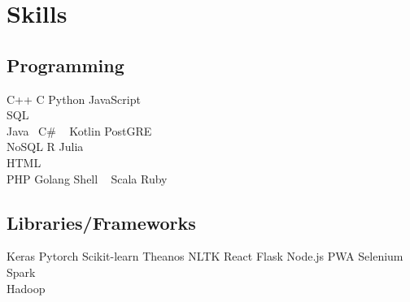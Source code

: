 \documentclass[]{BismayResume}
\begin{document}
\begin{minipage}[t]{0.70\textwidth}
%
%

\end{minipage} 
\hfill
\begin{minipage}[t]{0.25\textwidth} 


\section{Skills}
\subsection{Programming}
\sectionsep
{}
C++ \textbullet{} C \textbullet{} Python \textbullet{} JavaScript  \\ SQL  \\

\sectionsep
{}
Java \textbullet{} \ C\# \ \textbullet{}  Kotlin \textbullet{} PostGRE \\ NoSQL \textbullet{} R \textbullet{} Julia \\ HTML \\
\sectionsep
{}
PHP \textbullet{}  Golang \textbullet{} Shell \ \textbullet{} Scala \textbullet{} Ruby
\sectionsep
\sectionsep
\subsection{Libraries/Frameworks}
\sectionsep
Keras \textbullet{} Pytorch \textbullet{} Scikit-learn \textbullet{} Theanos \textbullet{} NLTK \textbullet{} React \textbullet{} Flask \textbullet{} Node.js \textbullet{} PWA \textbullet{} Selenium \textbullet{} Spark \\  Hadoop   \\
\sectionsep
\sectionsep

\end{minipage}
\end{document}
